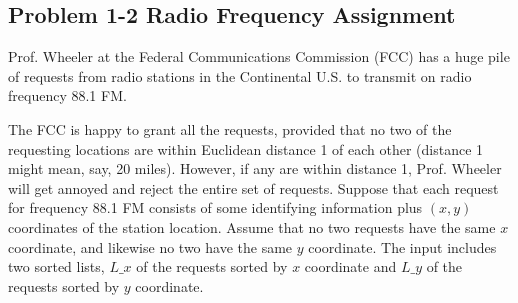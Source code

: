 \documentclass[12pt]{article}
\begin{document}
\subsection*{Problem 1-2 Radio Frequency Assignment}
\par{Prof. Wheeler at the Federal Communications Commission (FCC) has a huge pile of requests from radio stations in the Continental U.S. to transmit on radio frequency 88.1 FM.}
\par{The FCC is happy to grant all the requests, provided that no two of the requesting locations are within Euclidean distance 1 of each other (distance 1 might mean, say, 20 miles). However, if any are within distance 1, Prof. Wheeler will get annoyed and reject the entire set of requests. Suppose that each request for frequency 88.1 FM consists of some identifying information plus $(x, y)$ coordinates of the station location. Assume that no two requests have the same $x$ coordinate, and likewise no two have the same $y$ coordinate. The input includes two sorted lists, $L\_x$ of the requests sorted by $x$ coordinate and $L\_y$ of the requests sorted by $y$ coordinate.}
\end{document}
